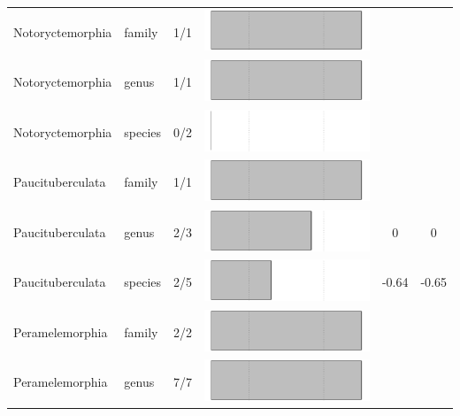 \begin{longtable}{lL{1.8cm}C{2cm}ccc}
  Notoryctemorphia & family & 1/1 & \includegraphics[width=0.20\linewidth, height=0.05\linewidth]{Missing_mammals/Table_figures/bar46.pdf} &   &   \\ 
  Notoryctemorphia & genus & 1/1 & \includegraphics[width=0.20\linewidth, height=0.05\linewidth]{Missing_mammals/Table_figures/bar47.pdf} &   &   \\ 
  Notoryctemorphia & species & 0/2 & \includegraphics[width=0.20\linewidth, height=0.05\linewidth]{Missing_mammals/Table_figures/bar48.pdf} &   &   \\ 
  Paucituberculata & family & 1/1 & \includegraphics[width=0.20\linewidth, height=0.05\linewidth]{Missing_mammals/Table_figures/bar49.pdf} &   &   \\ 
  Paucituberculata & genus & 2/3 & \includegraphics[width=0.20\linewidth, height=0.05\linewidth]{Missing_mammals/Table_figures/bar50.pdf} & 0 & 0 \\ 
  Paucituberculata & species & 2/5 & \includegraphics[width=0.20\linewidth, height=0.05\linewidth]{Missing_mammals/Table_figures/bar51.pdf} & -0.64 & -0.65 \\ 
  Peramelemorphia & family & 2/2 & \includegraphics[width=0.20\linewidth, height=0.05\linewidth]{Missing_mammals/Table_figures/bar52.pdf} &   &   \\ 
  Peramelemorphia & genus & 7/7 & \includegraphics[width=0.20\linewidth, height=0.05\linewidth]{Missing_mammals/Table_figures/bar53.pdf} &   &   \\ 

\end{longtable}
